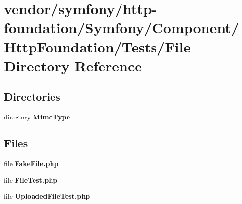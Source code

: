 \section{vendor/symfony/http-\/foundation/\+Symfony/\+Component/\+Http\+Foundation/\+Tests/\+File Directory Reference}
\label{dir_7f413218b0afbf62cb1296bbb581e512}
\subsection*{Directories}
\begin{DoxyCompactItemize}
\item 
directory {\bf Mime\+Type}
\end{DoxyCompactItemize}
\subsection*{Files}
\begin{DoxyCompactItemize}
\item 
file {\bf Fake\+File.\+php}
\item 
file {\bf File\+Test.\+php}
\item 
file {\bf Uploaded\+File\+Test.\+php}
\end{DoxyCompactItemize}
